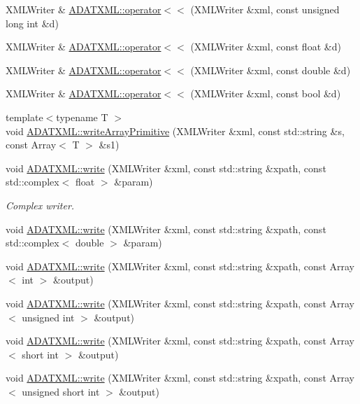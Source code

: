 \begin{DoxyCompactItemize}
X\+M\+L\+Writer \& \mbox{\hyperlink{group__io_gaaf0b05a50d9a15119bf89b91d941b9d2}{A\+D\+A\+T\+X\+M\+L\+::operator$<$$<$}} (X\+M\+L\+Writer \&xml, const unsigned long int \&d)
\item 
X\+M\+L\+Writer \& \mbox{\hyperlink{group__io_ga5bf37d07fe43369189518f64fd8ca05d}{A\+D\+A\+T\+X\+M\+L\+::operator$<$$<$}} (X\+M\+L\+Writer \&xml, const float \&d)
\item 
X\+M\+L\+Writer \& \mbox{\hyperlink{group__io_ga3325d0cff5609ce8a1d74b516e9dfcf8}{A\+D\+A\+T\+X\+M\+L\+::operator$<$$<$}} (X\+M\+L\+Writer \&xml, const double \&d)
\item 
X\+M\+L\+Writer \& \mbox{\hyperlink{group__io_ga9d2ed7a5f0ca12a3b4f993f19ee4473e}{A\+D\+A\+T\+X\+M\+L\+::operator$<$$<$}} (X\+M\+L\+Writer \&xml, const bool \&d)
\item 
{\footnotesize template$<$typename T $>$ }\\void \mbox{\hyperlink{namespaceADATXML_a6f40a822deea06e9a305fee4e7d89a17}{A\+D\+A\+T\+X\+M\+L\+::write\+Array\+Primitive}} (X\+M\+L\+Writer \&xml, const std\+::string \&s, const Array$<$ T $>$ \&s1)
\item 
void \mbox{\hyperlink{group__io_ga120f4c9a4f62f8190c2d87d73124fded}{A\+D\+A\+T\+X\+M\+L\+::write}} (X\+M\+L\+Writer \&xml, const std\+::string \&xpath, const std\+::complex$<$ float $>$ \&param)
\begin{DoxyCompactList}\small\item\em Complex writer. \end{DoxyCompactList}\item 
void \mbox{\hyperlink{group__io_ga841e4774bcd8f9d6b7d0d8f0ae20d34f}{A\+D\+A\+T\+X\+M\+L\+::write}} (X\+M\+L\+Writer \&xml, const std\+::string \&xpath, const std\+::complex$<$ double $>$ \&param)
\item 
void \mbox{\hyperlink{group__io_ga79aaea02aba2cdc3c3374686eca9fd1e}{A\+D\+A\+T\+X\+M\+L\+::write}} (X\+M\+L\+Writer \&xml, const std\+::string \&xpath, const Array$<$ int $>$ \&output)
\item 
void \mbox{\hyperlink{group__io_ga69642f017daf4afef39564d30ba6cba1}{A\+D\+A\+T\+X\+M\+L\+::write}} (X\+M\+L\+Writer \&xml, const std\+::string \&xpath, const Array$<$ unsigned int $>$ \&output)
\item 
void \mbox{\hyperlink{group__io_ga5b987571b14df546fba76f92cb272d5d}{A\+D\+A\+T\+X\+M\+L\+::write}} (X\+M\+L\+Writer \&xml, const std\+::string \&xpath, const Array$<$ short int $>$ \&output)
\item 
void \mbox{\hyperlink{group__io_gaae1762f924e581123d4df61dff9b9f5b}{A\+D\+A\+T\+X\+M\+L\+::write}} (X\+M\+L\+Writer \&xml, const std\+::string \&xpath, const Array$<$ unsigned short int $>$ \&output)

\end{DoxyCompactItemize}
